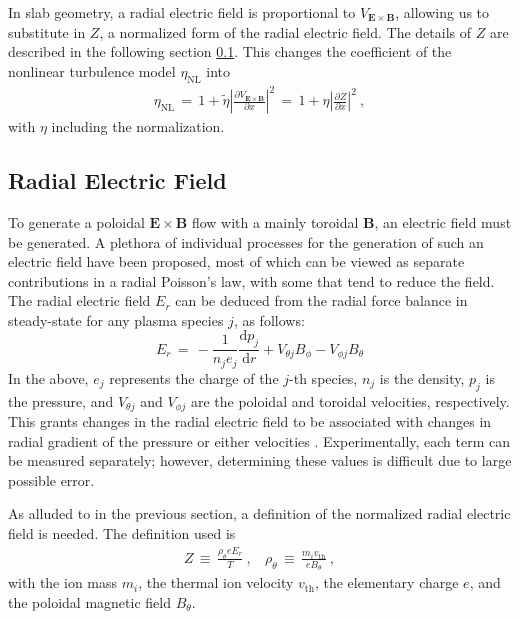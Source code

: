 In slab geometry, a radial electric field is proportional to $V_{\mathbf{E}\times\mathbf{B}}$, allowing us to substitute in $Z$, a normalized form of the radial electric field.
The details of $Z$ are described in the following section \ref{ssec:E_r}.
This changes the coefficient of the nonlinear turbulence model $\eta_\text{NL}$ into
\begin{align} %
	\eta_\text{NL} \,=\, 1 + \tilde{\eta} \left|\frac{\partial V_{\mathbf{E}\times\mathbf{B}}}{\partial x}\right|^2
	\,=\, 1 + \eta\left|\frac{\partial Z}{\partial x}\right|^2~,
	\label{eq:saturation_normalization}
\end{align}
with $\eta$ including the normalization.

\subsection{Radial Electric Field}\label{ssec:E_r}
To generate a poloidal $\mathbf{E}\times\mathbf{B}$ flow with a mainly toroidal $\mathbf{B}$, an electric field must be generated.
A plethora of individual processes for the generation of such an electric field have been proposed, most of which can be viewed as separate contributions in a radial Poisson's law, with some that tend to reduce the field.
The radial electric field $E_r$ can be deduced from the radial force balance in steady-state for any plasma species $j$, as follows:
\begin{equation}
	E_r \,=\, -\frac{1}{n_j e_j} \frac{\text{d} p_j}{\text{d} r} + V_{\theta j} B_\phi - V_{\phi j} B_\theta
	\label{eq:E_r}
\end{equation}
In the above, $e_j$ represents the charge of the $j$-th species, $n_j$ is the density, $p_j$ is the pressure, and $V_{\theta j}$ and $V_{\phi j}$ are the poloidal and toroidal velocities, respectively.
This grants changes in the radial electric field to be associated with changes in radial gradient of the pressure or either velocities \cite{connor_review_2000}.
Experimentally, each term can be measured separately; however, determining these values is difficult due to large possible error.

As alluded to in the previous section, a definition of the normalized radial electric field is needed.
The definition used is
\begin{align} %
	Z \,\equiv\, \frac{\rho_\theta e E_r}{T}~, ~~~~ \rho_\theta \,\equiv\, \frac{m_i v_\text{th}}{e B_\theta}~,\label{eq:Z_and_rho_definitions}
\end{align}
with the ion mass $m_i$, the thermal ion velocity $v_\text{th}$, the elementary charge $e$, and the poloidal magnetic field $B_\theta$.

